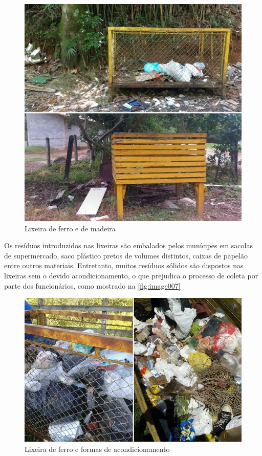 	\begin{figure}
		\centering
		\includegraphics[width=0.7\linewidth]{produtos/prodtres/image006}
		\caption{Lixeira de ferro e de madeira}
		\label{fig:image006}
	\end{figure}
	
	Os resíduos introduzidos nas lixeiras são embalados pelos munícipes em sacolas de supermercado, saco plástico pretos de volumes distintos, caixas de papelão entre outros materiais. Entretanto, muitos resíduos sólidos são dispostos nas lixeiras sem o devido acondicionamento, o que prejudica o processo de coleta por parte dos funcionários, como mostrado na \autoref{fig:image007}
	
	\begin{figure}
		\centering
		\includegraphics[width=0.7\linewidth]{produtos/prodtres/image007}
		\caption{Lixeira de ferro e formas de acondicionamento}
		\label{fig:image007}
	\end{figure}
		
